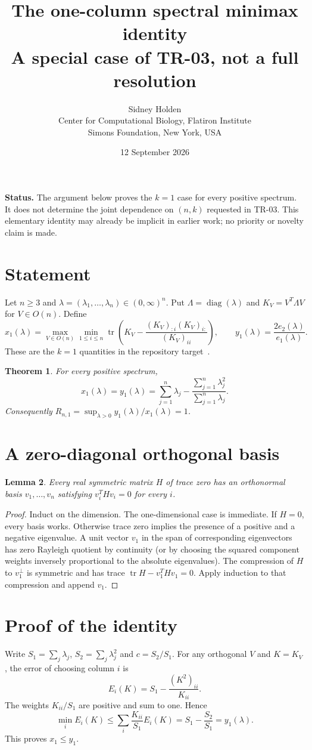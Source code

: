 \documentclass[11pt]{article}
\title{The one-column spectral minimax identity\\[3pt]\large A special case of TR-03, not a full resolution}
\author{Sidney Holden\\\small Center for Computational Biology, Flatiron Institute\\\small Simons Foundation, New York, USA}
\date{12 September 2026}
\newtheorem{theorem}{Theorem}
\newtheorem{lemma}[theorem]{Lemma}
\newcommand{\tr}{\operatorname{tr}}
\newcommand{\diag}{\operatorname{diag}}
\begin{document}
\maketitle
\noindent\textbf{Status.} The argument below proves the $k=1$ case for every positive spectrum. It does not determine the joint dependence on $(n,k)$ requested in TR-03. This elementary identity may already be implicit in earlier work; no priority or novelty claim is made.

\section{Statement}
Let $n\ge3$ and $\lambda=(\lambda_1,\ldots,\lambda_n)\in(0,\infty)^n$. Put $\Lambda=\diag(\lambda)$ and $K_V=V^T\Lambda V$ for $V\in O(n)$. Define
\[
 x_1(\lambda)=\max_{V\in O(n)}\min_{1\le i\le n}
 \tr\left(K_V-\frac{(K_V)_{:i}(K_V)_{i:}}{(K_V)_{ii}}\right),
 \qquad y_1(\lambda)=\frac{2e_2(\lambda)}{e_1(\lambda)}.
\]
These are the $k=1$ quantities in the repository target~\cite{repo}.
\begin{theorem}
For every positive spectrum,
\[
 x_1(\lambda)=y_1(\lambda)
 =\sum_{j=1}^n\lambda_j-
   \frac{\sum_{j=1}^n\lambda_j^2}{\sum_{j=1}^n\lambda_j}.
\]
Consequently $R_{n,1}=\sup_{\lambda>0}y_1(\lambda)/x_1(\lambda)=1$.
\end{theorem}

\section{A zero-diagonal orthogonal basis}
\begin{lemma}
Every real symmetric matrix $H$ of trace zero has an orthonormal basis $v_1,\ldots,v_n$ satisfying $v_i^THv_i=0$ for every $i$.
\end{lemma}
\begin{proof}
Induct on the dimension. The one-dimensional case is immediate. If $H=0$, every basis works. Otherwise trace zero implies the presence of a positive and a negative eigenvalue. A unit vector $v_1$ in the span of corresponding eigenvectors has zero Rayleigh quotient by continuity (or by choosing the squared component weights inversely proportional to the absolute eigenvalues). The compression of $H$ to $v_1^\perp$ is symmetric and has trace $\tr H-v_1^THv_1=0$. Apply induction to that compression and append $v_1$.
\end{proof}

\section{Proof of the identity}
Write $S_1=\sum_j\lambda_j$, $S_2=\sum_j\lambda_j^2$ and $c=S_2/S_1$. For any orthogonal $V$ and $K=K_V$, the error of choosing column $i$ is
\[
 E_i(K)=S_1-\frac{(K^2)_{ii}}{K_{ii}}.
\]
The weights $K_{ii}/S_1$ are positive and sum to one. Hence
\[
 \min_i E_i(K)\le
 \sum_i\frac{K_{ii}}{S_1}E_i(K)
 =S_1-\frac{S_2}{S_1}=y_1(\lambda).
\]
This proves $x_1\le y_1$.
\end{document}
